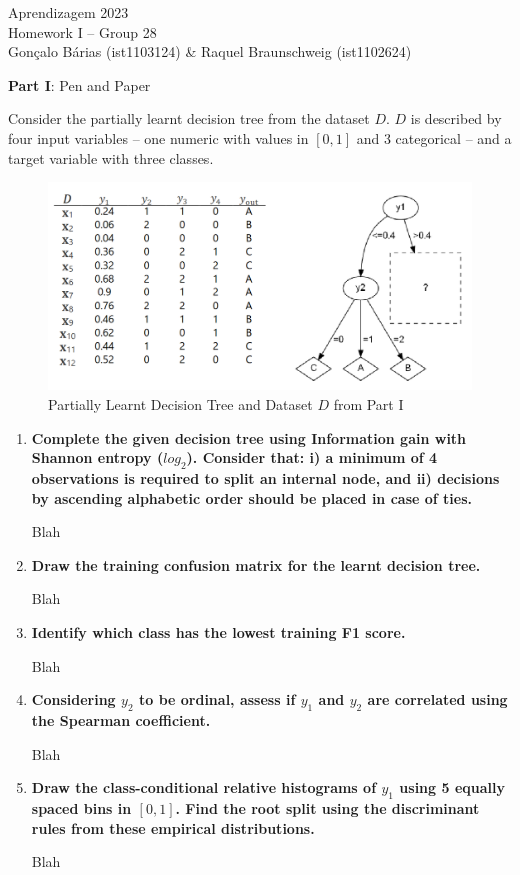 \documentclass[12pt]{article}
\begin{document}
\begin{center}
\large{Aprendizagem 2023}\\
Homework I -- Group 28\\
\vskip 0.3cm
Gonçalo Bárias (ist1103124) \& Raquel Braunschweig (ist1102624)\vskip 1cm

\large{\textbf{Part I}: Pen and Paper}\normalsize
\end{center}

\noindent Consider the partially learnt decision tree from the dataset $D$. $D$ is described by four input variables –
one numeric with values in $[0,1]$ and 3 categorical – and a target variable with three classes.

\begin{figure}[H]
    \centering
    \includegraphics[width=15cm]{./assets/partial_tree_dataset_d}
    \caption{Partially Learnt Decision Tree and Dataset $D$ from Part I}
    \label{fig:PartI-partial-decision-tree-dataset-d}
\end{figure}

\begin{enumerate}[leftmargin=\labelsep]
    \item \textbf{Complete the given decision tree using Information gain with Shannon entropy ($log_2$).
    Consider that: i) a minimum of 4 observations is required to split an internal node, and
    ii) decisions by ascending alphabetic order should be placed in case of ties.}

    Blah

    \item \textbf{Draw the training confusion matrix for the learnt decision tree.}

    Blah

    \item \textbf{Identify which class has the lowest training F1 score.}

    Blah

    \item \textbf{Considering $y_2$ to be ordinal, assess if $y_1$ and $y_2$ are correlated using the Spearman coefficient.}

    Blah

    \item \textbf{Draw the class-conditional relative histograms of $y_1$ using 5 equally spaced bins in $[0,1]$.
    Find the root split using the discriminant rules from these empirical distributions.}

    Blah
\end{enumerate}
\end{document}

